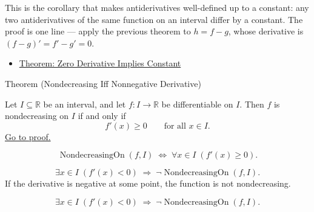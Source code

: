 \begin{remark*}[Interpretation]
This is the corollary that makes antiderivatives well-defined up to a constant: any two antiderivatives of the same function on an interval differ by a constant. The proof is one line --- apply the previous theorem to $h = f - g$, whose derivative is $(f-g)' = f'-g' = 0$.
\end{remark*}

\begin{dependencies}
\begin{itemize}
  \item \hyperref[thm:zero-derivative-implies-constant]{Theorem: Zero Derivative Implies Constant}
\end{itemize}
\end{dependencies}


\begin{theorembox}{Theorem (Nondecreasing Iff Nonnegative Derivative)}
\begin{theorem}
\label{thm:nondecreasing-iff-nonneg-derivative}
Let $I \subseteq \mathbb{R}$ be an interval, and let $f : I \to \mathbb{R}$ be differentiable on $I$. Then $f$ is nondecreasing on $I$ if and only if
\[
f'(x) \geq 0 \qquad \text{for all } x \in I.
\]
\hyperref[prf:nondecreasing-iff-nonneg-derivative]{Go to proof.}
\end{theorem}
\end{theorembox}

\begin{remark*}
\[
\operatorname{NondecreasingOn}(f,I)
\;\iff\;
\forall x \in I\;(f'(x) \geq 0).
\]
\end{remark*}

\begin{remark*}
\[
\exists x \in I\;(f'(x) < 0)
\;\Rightarrow\;
\lnot\operatorname{NondecreasingOn}(f,I).
\]
If the derivative is negative at some point, the function is not nondecreasing.
\end{remark*}

\begin{remark*}
\[
\exists x \in I\;(f'(x) < 0) \;\Rightarrow\; \lnot\operatorname{NondecreasingOn}(f,I).
\]
\end{remark*}


